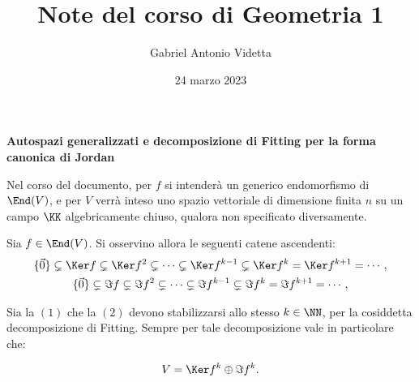 \documentclass[11pt]{article}
\title{\textbf{Note del corso di Geometria 1}}
\author{Gabriel Antonio Videtta}
\date{24 marzo 2023}
\begin{document}
	
	\maketitle
	
	\begin{center}
		\Large \textbf{Autospazi generalizzati e decomposizione di Fitting per la forma canonica di Jordan}
	\end{center}

	\begin{note}
		Nel corso del documento, per $f$ si intenderà un generico endomorfismo di $\End(V)$, e per $V$
		verrà inteso uno spazio vettoriale di dimensione finita $n$ su un campo $\KK$ algebricamente
		chiuso, qualora non specificato diversamente.
	\end{note}
	
	Sia $f \in \End(V)$. Si osservino allora le seguenti catene ascendenti:
	\begin{gather}
		\{\vec0\} \subsetneq \Ker f \subsetneq \Ker f^2 \subsetneq \cdots \subsetneq \Ker f^{k-1} \subsetneq \Ker f^k = \Ker f^{k+1} = \cdots, \\
		\{\vec0\} \subsetneq \Im f \subsetneq \Im f^2 \subsetneq \cdots \subsetneq \Im f^{k-1} \subsetneq \Im f^k = \Im f^{k+1} = \cdots,
	\end{gather}

	Sia la $(1)$ che la $(2)$ devono stabilizzarsi allo stesso $k \in \NN$, per la cosiddetta decomposizione di Fitting.
	Sempre per tale decomposizione vale in particolare che:
	
	\[ V = \Ker f^k \oplus \Im f^k. \]
	
\end{document}
